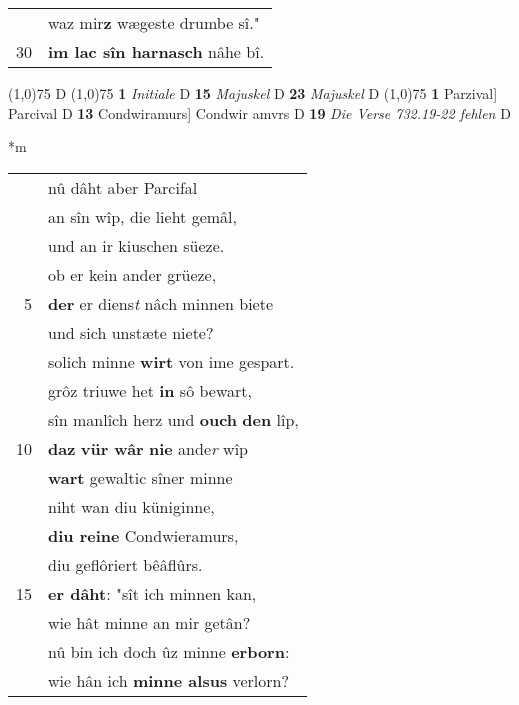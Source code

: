 \documentclass[8pt,a4paper,notitlepage]{article}
\begin{document}
\begin{table}[ht]
\begin{minipage}[t]{0.5\linewidth}
\begin{tabular}{rl}
 & waz mir\textbf{z} wægeste drumbe sî."\\ 
30 & \textbf{im lac sîn harnasch} nâhe bî.\\ 
\end{tabular}
\scriptsize
\line(1,0){75} \newline
D \newline
\line(1,0){75} \newline
\textbf{1} \textit{Initiale} D  \textbf{15} \textit{Majuskel} D  \textbf{23} \textit{Majuskel} D  \newline
\line(1,0){75} \newline
\textbf{1} Parzival] Parcival D \textbf{13} Condwiramurs] Condwir amvrs D \textbf{19} \textit{Die Verse 732.19-22 fehlen} D  \newline
\end{minipage}
\hspace{0.5cm}
\begin{minipage}[t]{0.5\linewidth}
\small
\begin{center}*m
\end{center}
\begin{tabular}{rl}
 & nû dâht aber Parcifal\\ 
 & an sîn wîp, die lieht gemâl,\\ 
 & und an ir kiuschen süeze.\\ 
 & ob er kein ander grüeze,\\ 
5 & \textbf{der} er diens\textit{t} nâch minnen biete\\ 
 & und sich unstæte niete?\\ 
 & solich minne \textbf{wirt} von ime gespart.\\ 
 & grôz triuwe het \textbf{in} sô bewart,\\ 
 & sîn manlîch herz und \textbf{ouch} \textbf{den} lîp,\\ 
10 & \textbf{daz} \textbf{vür wâr} \textbf{nie} ande\textit{r} wîp\\ 
 & \textbf{wart} gewaltic sîner minne\\ 
 & niht wan diu küniginne,\\ 
 & \textbf{diu reine} Condwieramurs,\\ 
 & diu geflôriert bêâflûrs.\\ 
15 & \textbf{er dâht}: "sît ich minnen kan,\\ 
 & wie hât minne an mir getân?\\ 
 & nû bin ich doch ûz minne \textbf{erborn}:\\ 
 & wie hân ich \textbf{minne alsus} verlorn?\\ 

\end{tabular}
\end{minipage}
\end{table}
\end{document}
